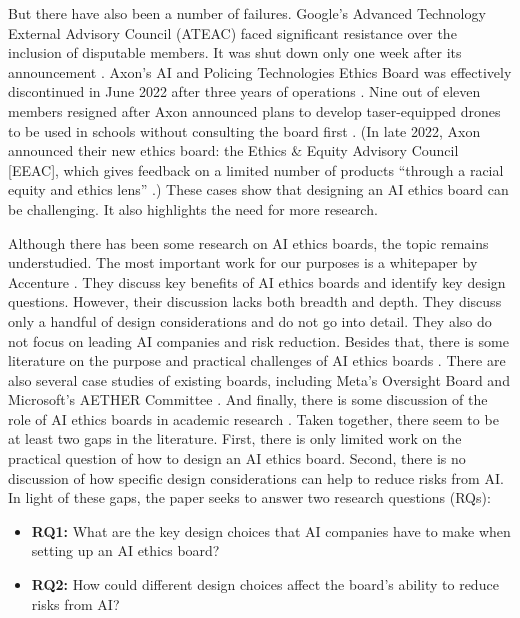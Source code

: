 \documentclass{article}
\begin{document}
But there have also been a number of failures. Google’s Advanced Technology External Advisory Council (ATEAC) faced significant resistance over the inclusion of disputable members. It was shut down only one week after its announcement \cite{piper2019googlefail, acquisti2019tweet, transphobia2019googlers, walker2019external}. Axon’s AI and Policing Technologies Ethics Board was effectively discontinued in June 2022 after three years of operations \cite{smith2022axon}. Nine out of eleven members resigned after Axon announced plans to develop taser-equipped drones to be used in schools without consulting the board first \cite{policing2022resigning}. (In late 2022, Axon announced their new ethics board: the Ethics \& Equity Advisory Council [EEAC], which gives feedback on a limited number of products “through a racial equity and ethics lens” \cite{axon2022ethicsequity}.) These cases show that designing an AI ethics board can be challenging. It also highlights the need for more research.

Although there has been some research on AI ethics boards, the topic remains understudied.
The most important work for our purposes is a whitepaper by Accenture \cite{sandler2019building}. They discuss key benefits of AI ethics boards and identify key design questions. However, their discussion lacks both breadth and depth. They discuss only a handful of design considerations and do not go into detail. They also do not focus on leading AI companies and risk reduction. Besides that, there is some literature on the purpose \cite{jordan2019designing, tiell2019create, morley2021ethics} and practical challenges of AI ethics boards \cite{adalovelace2022looking, gupta2020ai}. There are also several case studies of existing boards, including Meta’s Oversight Board \cite{wong2022meta} and Microsoft’s AETHER Committee \cite{newman2020decisionpoints}. And finally, there is some discussion of the role of AI ethics boards in academic research \cite{bernstein2021ethics, srikumar2022advancing}. Taken together, there seem to be at least two gaps in the literature. First, there is only limited work on the practical question of how to design an AI ethics board. Second, there is no discussion of how specific design considerations can help to reduce risks from AI. In light of these gaps, the paper seeks to answer two research questions (RQs):

\begin{itemize}[leftmargin=2em]
    \item \textbf{RQ1:} What are the key design choices that AI companies have to make when setting up an AI ethics board?
    \item \textbf{RQ2:} How could different design choices affect the board’s ability to reduce risks from AI?
\end{itemize}
\end{document}
